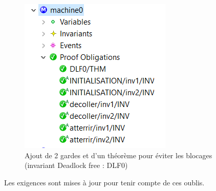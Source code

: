 \begin{figure}[H]
	\begin{center}	
		\includegraphics[scale=0.8]{images/0/proof0}
		\caption{Ajout de 2 gardes et d'un théorème pour éviter les blocages (invariant Deadlock free : DLF0)}
		\label{garde}
	\end{center}
\end{figure}

 Les exigences sont mises à jour pour tenir compte de ces oublis.

